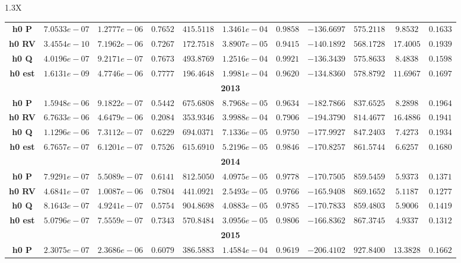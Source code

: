 \documentclass[10pt]{article}
\begin{document}
{\begin{tabularx}{1.3\textwidth}{X}
{\begin{tabular}{ccccccccccc}
\cmidrule(r){1-11} 
 { {\bf h0 P}}& $7.0533e-07$ & $1.2777e-06$ & $0.7652$ & $415.5118$ & $1.3461e-04$ & $0.9858$ & $-136.6697$& $575.2118$& $9.8532$ &$0.1633$\\
 { {\bf h0 RV}}& $3.4554e-10$ & $7.1962e-06$ & $0.7267$ & $172.7518$ & $3.8907e-05$ & $0.9415$ & $-140.1892$& $568.1728$& $17.4005$ &$0.1939$\\
 { {\bf h0 Q}}& $4.0196e-07$ & $9.2171e-07$ & $0.7673$ & $493.8769$ & $1.2516e-04$ & $0.9921$ & $-136.3439$& $575.8633$& $8.4838$ &$0.1598$\\
 { {\bf h0 est}}& $1.6131e-09$ & $4.7746e-06$ & $0.7777$ & $196.4648$ & $1.9981e-04$ & $0.9620$ & $-134.8360$& $578.8792$& $11.6967$ &$0.1697$\\
\bottomrule
\multicolumn{11}{c}{{\bf2013}} \\
\cmidrule(r){1-11} 
 { {\bf h0 P}}& $1.5948e-06$ & $9.1822e-07$ & $0.5442$ & $675.6808$ & $8.7968e-05$ & $0.9634$ & $-182.7866$& $837.6525$& $8.2898$ &$0.1964$\\
 { {\bf h0 RV}}& $6.7633e-06$ & $4.6479e-06$ & $0.2084$ & $353.9346$ & $3.9988e-04$ & $0.7906$ & $-194.3790$& $814.4677$& $16.4886$ &$0.1941$\\
 { {\bf h0 Q}}& $1.1296e-06$ & $7.3112e-07$ & $0.6229$ & $694.0371$ & $7.1336e-05$ & $0.9750$ & $-177.9927$& $847.2403$& $7.4273$ &$0.1934$\\
 { {\bf h0 est}}& $6.7657e-07$ & $6.1201e-07$ & $0.7526$ & $615.6910$ & $5.2196e-05$ & $0.9846$ & $-170.8257$& $861.5744$& $6.6257$ &$0.1680$\\
\bottomrule
\multicolumn{11}{c}{{\bf2014}} \\
\cmidrule(r){1-11} 
 { {\bf h0 P}}& $7.9291e-07$ & $5.5089e-07$ & $0.6141$ & $812.5050$ & $4.0975e-05$ & $0.9778$ & $-170.7505$& $859.5459$& $5.9373$ &$0.1371$\\
 { {\bf h0 RV}}& $4.6841e-07$ & $1.0087e-06$ & $0.7804$ & $441.0921$ & $2.5493e-05$ & $0.9766$ & $-165.9408$& $869.1652$& $5.1187$ &$0.1277$\\
 { {\bf h0 Q}}& $8.1643e-07$ & $4.9241e-07$ & $0.5754$ & $904.8698$ & $4.0883e-05$ & $0.9785$ & $-170.7833$& $859.4803$& $5.9006$ &$0.1419$\\
 { {\bf h0 est}}& $5.0796e-07$ & $7.5559e-07$ & $0.7343$ & $570.8484$ & $3.0956e-05$ & $0.9806$ & $-166.8362$& $867.3745$& $4.9337$ &$0.1312$\\
\bottomrule
\multicolumn{11}{c}{{\bf2015}} \\
\cmidrule(r){1-11} 
 { {\bf h0 P}}& $2.3075e-07$ & $2.3686e-06$ & $0.6079$ & $386.5883$ & $1.4584e-04$ & $0.9619$ & $-206.4102$& $927.8400$& $13.3828$ &$0.1662$\\

\end{tabular}}
\end{tabularx}}
\end{document}
